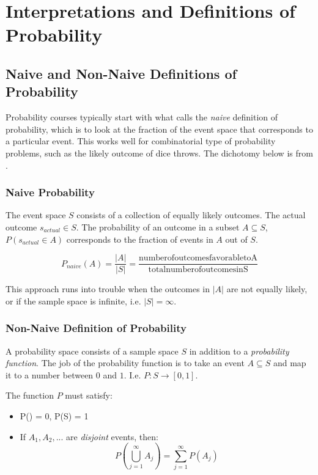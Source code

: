 \section{Interpretations and Definitions of Probability}

\subsection{Naive and Non-Naive Definitions of Probability}
Probability courses typically start with what  calls the \textit{naive} definition of probability, which is to look at the fraction of the event space that corresponds to a particular event. This works well for combinatorial type of probability problems, such as the likely outcome of dice throws. The dichotomy below is from .

\subsubsection{Naive Probability}
The event space $S$ consists of a collection of equally likely outcomes. The actual outcome $s_{actual} \in S$. The probability of an outcome in a subset $A\subseteq S$, $P(s_{actual}\in A)$ corresponds to the fraction of events in $A$ out of $S$.

\begin{equation}
P_{naive}(A) = \frac{|A|}{|S|} = \frac{\mathrm{number of outcomes favorable to A}}{\mathrm{total number of outcomes in S}}
\end{equation}

This approach runs into trouble when the outcomes in $|A|$ are not equally likely, or if the sample space is infinite, i.e. $|S|=\infty$.


\subsubsection{Non-Naive Definition of Probability}
A probability space consists of a sample space $S$ in addition to a \textit{probability function}. The job of the probability function is to take an event $A\subseteq S$ and map it to a number between $0$ and $1$. I.e.  $P: S \rightarrow [0,1]$.

The function $P$ must satisfy:

\begin{itemize}
\item P(\empty) = 0, P(S) = 1
\item If $A_1, A_2,...$ are \textit{disjoint} events, then: \begin{equation}P\left(\bigcup^{\infty}_{j=1}A_j \right) = \sum_{j=1}^{\infty}P(A_j)\end{equation}
\end{itemize}

